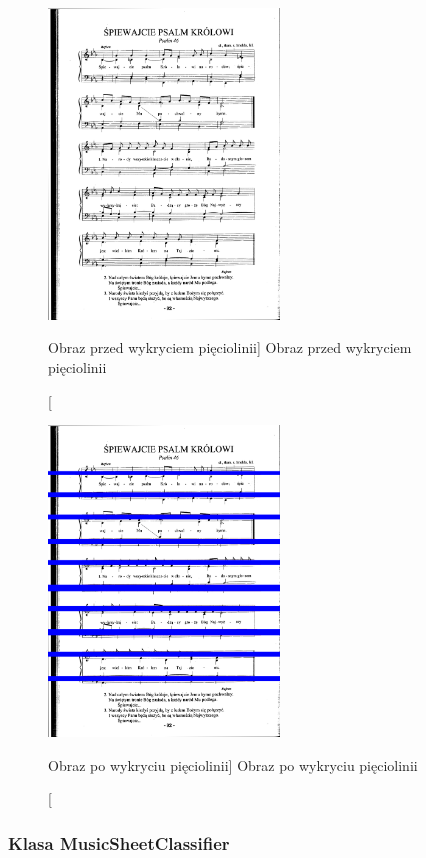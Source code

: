 \documentclass[a4paper,12pt]{article}
\begin{document}
    		\begin{figure}[!ht]  
			    \begin{center}
				    \includegraphics[height=8.25cm, frame] {image//exampleImage//004_a.png} 
			    \end{center}
			    \caption
    			    [Obraz przed wykryciem pięciolinii]  
    			    {Obraz przed wykryciem pięciolinii}  
		    \end{figure} 
		
		    \begin{figure}[!ht]  
			    \begin{center}
				    \includegraphics[height=8.25cm, frame] {image//exampleImage//004_b.png} 
			    \end{center}
			    \caption
    			    [Obraz po wykryciu pięciolinii]  
    			    {Obraz po wykryciu pięciolinii}  
		    \end{figure} 
		
		\subsubsection{Klasa MusicSheetClassifier}  
\end{document}
